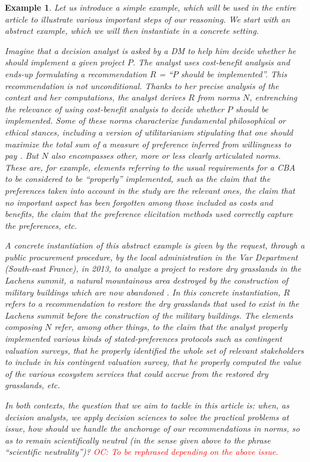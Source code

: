 \documentclass[preprint, french, english, 11pt, authoryear]{elsarticle}%
\newtheorem{example}{Example}
\newcommand{\commentOC}[1]{\textcolor{red}{OC: #1}}
\begin{document}
\begin{example}
Let us introduce a simple example, which will be used in the entire article to illustrate various important steps of our reasoning. %
We start with an abstract example, which we will then instantiate in a concrete setting.

Imagine that a decision analyst is asked by a \ac{DM} to help him decide whether he should implement a given project $P$.
The analyst uses cost-benefit analysis \citep{layard_cost-benefit_1994} and ends-up formulating a recommendation $R$ = “$P$ should be implemented”.
This recommendation is not unconditional. Thanks to her precise analysis of the context and her computations, the analyst derives $R$ from norms $N$, entrenching the relevance of using cost-benefit analysis to decide whether $P$ should be implemented. Some of these norms characterize fundamental philosophical or ethical stances, including a version of utilitarianism stipulating that one should maximize the total sum of a measure of preference inferred from willingness to pay \citep{meinard_ethical_2016}. 
But $N$ also encompasses other, more or less clearly articulated norms. These are, for example, elements referring to the usual requirements for a CBA to be considered to be ``properly'' implemented, such as the claim that the preferences taken into account in the study are the relevant ones, the claim that no important aspect has been forgotten among those included as costs and benefits, the claim that the preference elicitation methods used correctly capture the preferences, etc.

A concrete instantiation of this abstract example is given by the request, through a public procurement procedure, by the local administration in the Var Department (South-east France), in 2013, to analyze a project to restore dry grasslands in the Lachens summit, a natural mountainous area destroyed by the construction of military buildings which are now abandoned \citep{meinard_etude_2015}.
In this concrete instantiation, $R$ refers to a recommendation to restore the dry grasslands that used to exist in the Lachens summit before the construction of the military buildings. 
The elements composing $N$ refer, among other things, to the claim that the analyst properly implemented various kinds of stated-preferences protocols such as contingent valuation surveys, that he properly identified the whole set of relevant stakeholders to include in his contingent valuation survey, that he properly computed the value of the various ecosystem services that could accrue from the restored dry grasslands, etc.

In both contexts, the question that we aim to tackle in this article is: when, as decision analysts, we apply decision sciences to solve the practical problems at issue, how should we handle the anchorage of our recommendations in norms, so as to remain scientifically neutral (in the sense given above to the phrase ``scientific neutrality'')? \commentOC{To be rephrased depending on the above issue.}
\end{example}
\end{document}
